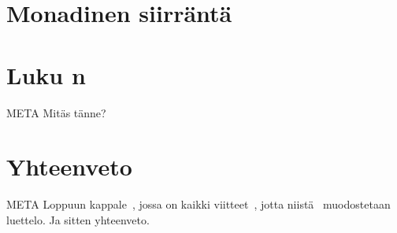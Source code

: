 \documentclass[finnish]{tktltiki2}
\begin{document}


\section{Monadinen siirräntä}



\section{Luku n}


META Mitäs tänne?

\section{Yhteenveto}


META Loppuun kappale~\cite{hoh07}, jossa on kaikki viitteet~\cite{tcih96}, jotta niistä~\cite{ifp93}
muodostetaan luettelo. Ja sitten yhteenveto.






\end{document}
